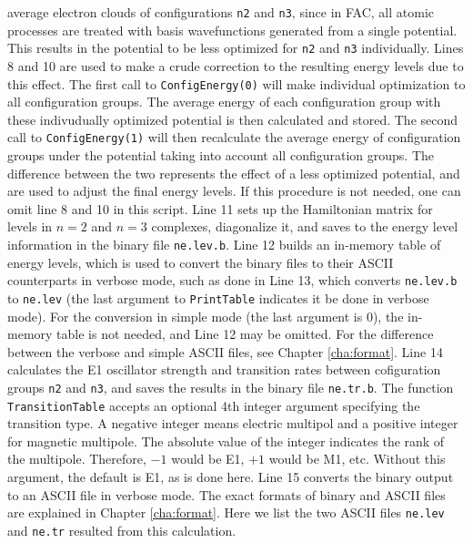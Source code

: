 \documentclass[twoside,letterpaper]{refrep}
\begin{document}
average electron clouds of configurations \verb|n2| and \verb|n3|, since in
FAC, all atomic processes are treated with basis wavefunctions generated from
a single potential. This
results in the potential to be less optimized for \verb|n2| and \verb|n3|
individually. Lines 8 and 10 are used to make a crude correction to the
resulting energy levels due to this effect. The first call to
\verb|ConfigEnergy(0)| will make individual optimization to all configuration
groups. The average energy of each configuration group with these indivudually 
optimized potential is then calculated and stored. The
second call to \verb|ConfigEnergy(1)| will then recalculate the average energy
of configuration groups under the potential taking into account all
configuration groups. The difference between the two represents the effect of
a less optimized potential, and are used to adjust the final energy levels. If
this procedure is not needed, one can omit line 8 and 10 in this script. Line
11 sets up the Hamiltonian matrix for levels in $n = 2$ and $n = 3$ complexes,
diagonalize it, and saves to the energy level information in the binary file
\verb|ne.lev.b|. Line 12 builds an in-memory table of energy levels, which is
used to convert the binary files to their ASCII counterparts in verbose mode,
such as done in Line 13, which converts \verb|ne.lev.b| to \verb|ne.lev| (the
last argument to \verb|PrintTable| indicates it be done in verbose mode). For
the conversion in simple mode (the last argument is 0), the in-memory table is
not needed, and Line 12 may be omitted. For the difference between the verbose
and simple ASCII files, see Chapter \ref{cha:format}. Line 14 calculates the
E1 oscillator strength and transition rates between cofiguration groups
\verb|n2| and \verb|n3|, and saves the results in the binary file
\verb|ne.tr.b|. The function \verb|TransitionTable| accepts an optional 4th
integer argument specifying the transition type. A negative integer means
electric multipol and a positive integer for magnetic multipole. The absolute
value of the integer indicates the rank of the multipole. Therefore, $-1$ would
be E1, $+1$ would be M1, etc. Without this argument, the default is E1, as is
done here. Line 15 converts the binary output to an ASCII file in verbose
mode. The exact formats of binary and ASCII files are explained in Chapter
\ref{cha:format}. Here we list the two ASCII files \verb|ne.lev| and
\verb|ne.tr| resulted from this calculation. 
\end{document}
